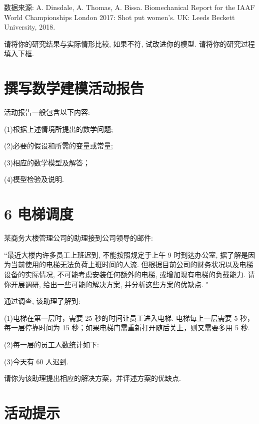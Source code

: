 \documentclass[10pt]{article}
\begin{document}
数据来源: A. Dinsdale, A. Thomas, A. Bissa. Biomechanical Report for the IAAF World Championships London 2017: Shot put women's. UK: Leeds Beckett University, 2018.

请将你的研究结果与实际情形比较, 如果不符, 试改进你的模型. 请将你的研究过程填入下框.

\section*{撰写数学建模活动报告}

活动报告一般包含以下内容:

(1)根据上述情境所提出的数学问题;

(2)必要的假设和所需的变量或常量;

(3)相应的数学模型及解答；

(4)模型检验及说明.



\section*{6 电梯调度}

某商务大楼管理公司的助理接到公司领导的邮件:

“最近大楼内许多员工上班迟到, 不能按照规定于上午 9 时到达办公室, 据了解是因为当前使用的电梯无法负荷上班时间的人流. 但根据目前公司的财务状况以及电梯设备的实际情况, 不可能考虑安装任何额外的电梯, 或增加现有电梯的负载能力. 请你开展调研, 给出一些可能的解决方案, 并分析这些方案的优缺点. "

通过调查, 该助理了解到:

(1)电梯在第一层时，需要 25 秒的时间让员工进入电梯. 电梯每上一层需要 5 秒， 每一层停靠时间为 15 秒；如果电梯门需重新打开随后关上，则又需要多用 5 秒.

(2)每一层的员工人数统计如下:

\begin{center}
\end{center}

(3)今天有 60 人迟到.

请你为该助理提出相应的解决方案，并评述方案的优缺点.

\section*{活动提示}
\end{document}
